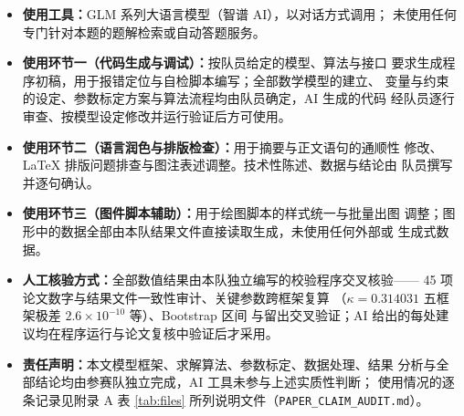 \documentclass[bwprint]{gmcmthesis}
\begin{document}
\begin{itemize}\setlength{\itemsep}{2pt}
  \item \textbf{使用工具：}GLM 系列大语言模型（智谱 AI），以对话方式调用；
        未使用任何专门针对本题的题解检索或自动答题服务。
  \item \textbf{使用环节一（代码生成与调试）：}按队员给定的模型、算法与接口
        要求生成程序初稿，用于报错定位与自检脚本编写；全部数学模型的建立、
        变量与约束的设定、参数标定方案与算法流程均由队员确定，AI 生成的代码
        经队员逐行审查、按模型设定修改并运行验证后方可使用。
  \item \textbf{使用环节二（语言润色与排版检查）：}用于摘要与正文语句的通顺性
        修改、\LaTeX{} 排版问题排查与图注表述调整。技术性陈述、数据与结论由
        队员撰写并逐句确认。
  \item \textbf{使用环节三（图件脚本辅助）：}用于绘图脚本的样式统一与批量出图
        调整；图形中的数据全部由本队结果文件直接读取生成，未使用任何外部或
        生成式数据。
  \item \textbf{人工核验方式：}全部数值结果由本队独立编写的校验程序交叉核验——
        45 项论文数字与结果文件一致性审计、关键参数跨框架复算
        （$\kappa=0.314031$ 五框架极差 $2.6\times10^{-10}$ 等）、Bootstrap 区间
        与留出交叉验证；AI 给出的每处建议均在程序运行与论文复核中验证后才采用。
  \item \textbf{责任声明：}本文模型框架、求解算法、参数标定、数据处理、结果
        分析与全部结论均由参赛队独立完成，AI 工具未参与上述实质性判断；
        使用情况的逐条记录见附录 A 表 \ref{tab:files} 所列说明文件（\texttt{PAPER\_CLAIM\_AUDIT.md}）。
\end{itemize}
\end{document}
